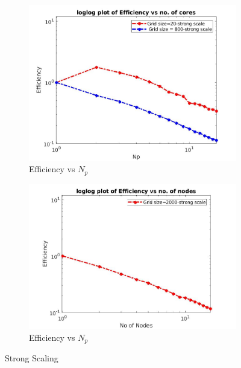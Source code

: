\documentclass{article}
\begin{document}
\begin{figure}[t!]
\medskip
\begin{subfigure}{0.48\textwidth}
\includegraphics[width=\linewidth]{Efficiencystrong.jpeg}
\caption{Efficiency vs $N_p$ } \label{fig:e}
\end{subfigure}\hspace*{\fill}
\begin{subfigure}{0.48\textwidth}
\includegraphics[width=\linewidth]{Efficiency2000.jpeg}
\caption{Efficiency vs $N_p$ } \label{fig:f}
\end{subfigure}

\caption{Strong Scaling} \label{fig:1}
\end{figure}
\end{document}
